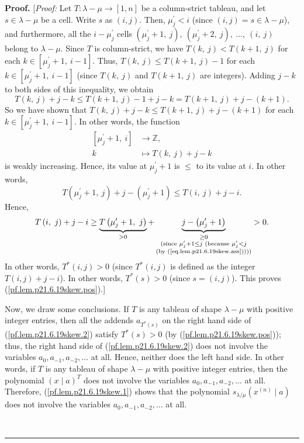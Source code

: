 \documentclass[numbers=enddot,12pt,final,onecolumn,notitlepage]{scrartcl}%
\theoremstyle{definition}
\newenvironment{proof}[1][Proof]{\noindent\textbf{#1.} }{\ \rule{0.5em}{0.5em}}
\newenvironment{noncompile}{}{}
\begin{document}
\begin{enumerate}
\begin{noncompile}
\begin{proof}
[\textit{Proof:} Let $T:\lambda-\mu\rightarrow\left[  1,n\right]  $ be a
column-strict tableau, and let $s\in\lambda-\mu$ be a cell. Write $s$ as
$\left(  i,j\right)  $. Then, $\mu_{j}^{\prime}<i$ (since $\left(  i,j\right)
=s\in\lambda-\mu$), and furthermore, all the $i-\mu_{j}^{\prime}$ cells
$\left(  \mu_{j}^{\prime}+1,\ j\right)  ,\ \left(  \mu_{j}^{\prime
}+2,\ j\right)  ,\ \ldots,\ \left(  i,\ j\right)  $ belong to $\lambda-\mu$.
Since $T$ is column-strict, we have $T\left(  k,\ j\right)  <T\left(
k+1,\ j\right)  $ for each $k\in\left[  \mu_{j}^{\prime}+1,\ i-1\right]  $.
Thus, $T\left(  k,\ j\right)  \leq T\left(  k+1,\ j\right)  -1$ for each
$k\in\left[  \mu_{j}^{\prime}+1,\ i-1\right]  $ (since $T\left(  k,\ j\right)
$ and $T\left(  k+1,\ j\right)  $ are integers). Adding $j-k$ to both sides of
this inequality, we obtain%
\[
T\left(  k,\ j\right)  +j-k\leq T\left(  k+1,\ j\right)  -1+j-k=T\left(
k+1,\ j\right)  +j-\left(  k+1\right)  .
\]
So we have shown that $T\left(  k,\ j\right)  +j-k\leq T\left(
k+1,\ j\right)  +j-\left(  k+1\right)  $ for each $k\in\left[  \mu_{j}%
^{\prime}+1,\ i-1\right]  $. In other words, the function%
\begin{align*}
\left[  \mu_{j}^{\prime}+1,\ i\right]   &  \rightarrow\mathbb{Z},\\
k  &  \mapsto T\left(  k,\ j\right)  +j-k
\end{align*}
is weakly increasing. Hence, its value at $\mu_{j}^{\prime}+1$ is $\leq$ to
its value at $i$. In other words,%
\[
T\left(  \mu_{j}^{\prime}+1,\ j\right)  +j-\left(  \mu_{j}^{\prime}+1\right)
\leq T\left(  i,\ j\right)  +j-i.
\]
Hence,%
\[
T\left(  i,\ j\right)  +j-i\geq\underbrace{T\left(  \mu_{j}^{\prime
}+1,\ j\right)  }_{>0}+\underbrace{j-\left(  \mu_{j}^{\prime}+1\right)
}_{\substack{\geq0\\\text{(since }\mu_{j}^{\prime}+1\leq j\text{ (because }%
\mu_{j}^{\prime}<j\\\text{(by (\ref{eq.lem.p21.6.19skew.ass}))))}}}>0.
\]
In other words, $T^{\ast}\left(  i,j\right)  >0$ (since $T^{\ast}\left(
i,j\right)  $ is defined as the integer $T\left(  i,j\right)  +j-i$). In other
words, $T^{\ast}\left(  s\right)  >0$ (since $s=\left(  i,j\right)  $). This
proves (\ref{pf.lem.p21.6.19skew.pos}).] \medskip

Now, we draw some conclusions. If $T$ is any tableau of shape $\lambda-\mu$
with positive integer entries, then all the addends $a_{T^{\ast}\left(
s\right)  }$ on the right hand side of (\ref{pf.lem.p21.6.19skew.2}) satisfy
$T^{\ast}\left(  s\right)  >0$ (by (\ref{pf.lem.p21.6.19skew.pos})); thus, the
right hand side of (\ref{pf.lem.p21.6.19skew.2}) does not involve the
variables $a_{0},a_{-1},a_{-2},\ldots$ at all. Hence, neither does the left
hand side. In other words, if $T$ is any tableau of shape $\lambda-\mu$ with
positive integer entries, then the polynomial $\left(  x\mid a\right)  ^{T}$
does not involve the variables $a_{0},a_{-1},a_{-2},\ldots$ at all. Therefore,
(\ref{pf.lem.p21.6.19skew.1}) shows that the polynomial $s_{\lambda/\mu
}\left(  x^{\left(  n\right)  }\mid a\right)  $ does not involve the variables
$a_{0},a_{-1},a_{-2},\ldots$ at all.


\end{proof}
\end{noncompile}
\end{enumerate}
\end{document}
